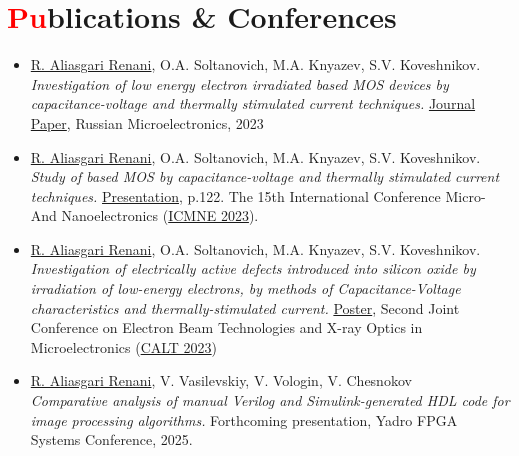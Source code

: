 \documentclass[a4paper,11pt]{article}
\newcommand{\resumeSubHeadingListStart}{\begin{itemize}[leftmargin=0.0in, label={}]}
\newcommand{\resumeSubHeadingListEnd}{\end{itemize}}
\begin{document}
\section{{\textcolor{red}{Pu}blications} \& Conferences}
\resumeSubHeadingListStart
    \item \underline{R. Aliasgari Renani}, O.A. Soltanovich, M.A. Knyazev, S.V. Koveshnikov. \\ \textit{Investigation of low energy electron irradiated  based MOS devices by capacitance-voltage and thermally stimulated current techniques.} \href{https://doi.org/10.1134/S1063739723600516}{Journal Paper}, Russian Microelectronics, 2023
    \item \underline{R. Aliasgari Renani}, O.A. Soltanovich, M.A. Knyazev, S.V. Koveshnikov. \\ \textit{Study of  based MOS by capacitance-voltage and thermally stimulated current techniques.} \href{https://icmne.ftian.ru/wp-content/uploads/icmne-2023_e-version.pdf}{Presentation}, p.122. The 15th International Conference Micro- And Nanoelectronics (\href{https://icmne.ftian.ru}{ICMNE 2023}).
    \item \underline{R. Aliasgari Renani}, O.A. Soltanovich, M.A. Knyazev, S.V. Koveshnikov. \\ \textit{Investigation of electrically active defects introduced into silicon oxide by irradiation of low-energy electrons, by methods of Capacitance-Voltage characteristics and thermally-stimulated current.} \href{https://cebt23.iptm.ru/download/numbered/91.pdf}{Poster}, Second Joint Conference on Electron Beam Technologies and X-ray Optics in Microelectronics (\href{https://cebt23.iptm.ru}{CALT 2023})
    \item \underline{R. Aliasgari Renani}, V. Vasilevskiy, V. Vologin, V. Chesnokov \\ \textit{Comparative analysis of manual Verilog and Simulink-generated HDL code for image processing algorithms.} Forthcoming presentation, Yadro FPGA Systems Conference, 2025.
    
\resumeSubHeadingListEnd
\vspace{-20pt}

\end{document}
